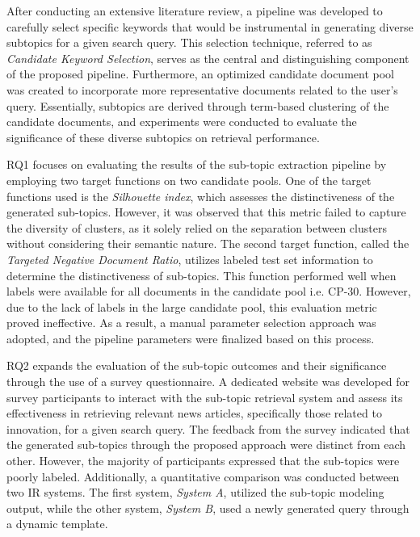 After conducting an extensive literature review, a pipeline was developed to carefully select specific keywords that would be instrumental in generating diverse subtopics for a given search query. This selection technique, referred to as \textit{Candidate Keyword Selection}, serves as the central and distinguishing component of the proposed pipeline. Furthermore, an optimized candidate document pool was created to incorporate more representative documents related to the user's query. Essentially, subtopics are derived through term-based clustering of the candidate documents, and experiments were conducted to evaluate the significance of these diverse subtopics on retrieval performance.


RQ1 focuses on evaluating the results of the sub-topic extraction pipeline by employing two target functions on two candidate pools. One of the target functions used is the \textit{Silhouette index}, which assesses the distinctiveness of the generated sub-topics. However, it was observed that this metric failed to capture the diversity of clusters, as it solely relied on the separation between clusters without considering their semantic nature. The second target function, called the \textit{Targeted Negative Document Ratio}, utilizes labeled test set information to determine the distinctiveness of sub-topics. This function performed well when labels were available for all documents in the candidate pool i.e. CP-30. However, due to the lack of labels in the large candidate pool, this evaluation metric proved ineffective. As a result, a manual parameter selection approach was adopted, and the pipeline parameters were finalized based on this process. 

RQ2 expands the evaluation of the sub-topic outcomes and their significance through the use of a survey questionnaire. A dedicated website was developed for survey participants to interact with the sub-topic retrieval system and assess its effectiveness in retrieving relevant news articles, specifically those related to innovation, for a given search query. The feedback from the survey indicated that the generated sub-topics through the proposed approach were distinct from each other. However, the majority of participants expressed that the sub-topics were poorly labeled. Additionally, a quantitative comparison was conducted between two \ac{IR} systems. The first system, \textit{System A}, utilized the sub-topic modeling output, while the other system, \textit{System B}, used a newly generated query through a dynamic template.

